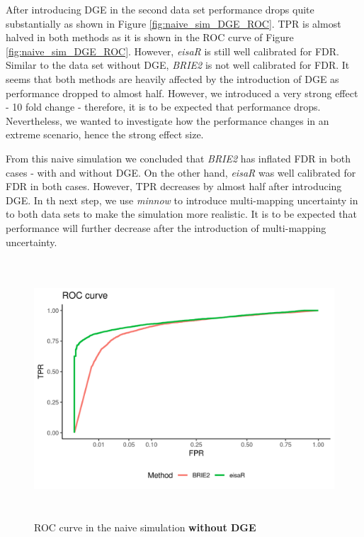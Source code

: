 After introducing DGE in the second data set performance drops quite substantially as shown in Figure \ref{fig:naive_sim_DGE_ROC}. TPR is almost halved in both methods as it is shown in the ROC curve of Figure \ref{fig:naive_sim_DGE_ROC}. However, \emph{eisaR} is still well calibrated for FDR. Similar to the data set without DGE, \emph{BRIE2} is not well calibrated for FDR. It seems that both methods are heavily affected by the introduction of DGE as performance dropped to almost half. However, we introduced a very strong effect - 10 fold change - therefore, it is to be expected that performance drops. Nevertheless, we wanted to investigate how the performance changes in an extreme scenario, hence the strong effect size. 

From this naive simulation we concluded that \emph{BRIE2} has inflated FDR in both cases - with and without DGE. On the other hand, \emph{eisaR} was well calibrated for FDR in both cases. However, TPR decreases by almost half after introducing DGE. In th next step, we use \emph{minnow} to introduce multi-mapping uncertainty in to both data sets to make the simulation more realistic. It is to be expected that performance will further decrease after the introduction of multi-mapping uncertainty.

\begin{figure}[!htb]
\begin{center}
\includegraphics[width=6in,height=3.8in]{../figures/simulation/naive_simulation_ROC.png}
\end{center}
\caption{ROC curve in the naive simulation \textbf{without DGE}}
\label{fig:naive_sim_ROC}
\end{figure}

